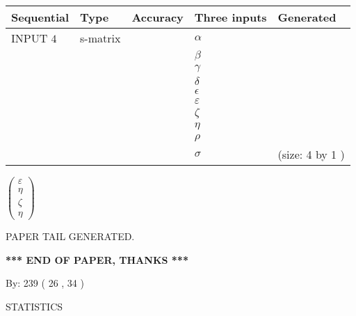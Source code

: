 \documentclass[12pt]{article}
\begin{document}
  
\noindent\begin{tabular}{|l|l|l|l|l|}
\hline
 Sequential & Type & Accuracy & Three inputs & Generated \\ 
\hline
 
 
  INPUT $  4 $ & s-matrix & & 
 $  \alpha $ & 
  \\
  & & & 
 $  \beta $ & 
  \\
  & & & 
 $  \gamma $ & 
  \\
  & & & 
 $  \delta $ & 
  \\
  & & & 
 $  \epsilon $ & 
  \\
  & & & 
 $  \varepsilon $ & 
  \\
  & & & 
 $                     \zeta $ & 
  \\
  & & & 
 $  \eta $ & 
  \\
  & & & 
 $  \rho $ & 
  \\
  & & & 
 $  \sigma $ & 
  (size:  4  by  1 )
 \\  \hline  
 \end{tabular}
   
   
 $  \left( \begin{array}
 {
 c
 }
 \varepsilon \\ 
 \eta \\ 
                    \zeta \\ 
 \eta
 \end{array} \right) $ 
   
   
   
   
 \vspace{0.2in}
 
   
   
\vspace{2.0in} PAPER TAIL GENERATED.
   
   
   
   
\vspace{1.0in} 
{\textbf{\large{ *** END OF PAPER, THANKS *** }}} 
   
   
\hspace{1.0in} By: 
 239 ( 26 ,  34 )
   
   
   
\vspace{0.2in}
\vspace{0.2in}
   
   
 \newpage
\setcounter{page}{1} 
   
   
 {\LARGE{STATISTICS}}
   
\vspace{0.2in}
   
\end{document}
